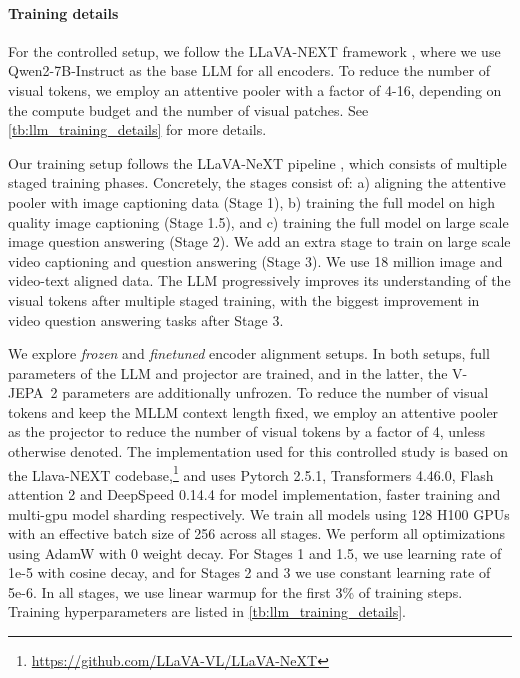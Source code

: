 \documentclass[]{fairmeta}
\newcommand{\model}{V-JEPA~2\xspace}
\begin{document}
\paragraph{\bf Training details} 
For the controlled setup, we follow the LLaVA-NEXT framework \citep{liu2024improved, zhang2024llavanext-video}, where we use Qwen2-7B-Instruct \citep{yang2024qwen2technicalreport} as the base LLM  for all encoders.
To reduce the number of visual tokens, we employ an attentive pooler with a factor of 4-16, depending on the compute budget and the number of visual patches. See \autoref{tb:llm_training_details} for more details.

Our training setup follows the LLaVA-NeXT pipeline \citep{li2024llava}, which consists of multiple staged training phases. Concretely, the stages consist of: a) aligning the attentive pooler with image captioning data (Stage 1), b) training the full model on high quality image captioning (Stage 1.5), and c) training the full model on large scale image question answering (Stage 2). We add an extra stage to train on large scale video captioning and question answering (Stage 3). 
We use 18 million image and video-text aligned data. 
The LLM progressively improves its understanding of the visual tokens after multiple staged training, with the biggest improvement in video question answering tasks after Stage 3. 

We explore \emph{frozen} and \emph{finetuned} encoder alignment setups.
In both setups, full parameters of the LLM and projector are trained, and in the latter, the \model parameters are additionally unfrozen. 
To reduce the number of visual tokens and keep the MLLM context length fixed, we employ an attentive pooler as the projector to reduce the number of visual tokens by a factor of 4, unless otherwise denoted.
The implementation used for this controlled study is based on the Llava-NEXT codebase,\footnote{\href{https://github.com/LLaVA-VL/LLaVA-NeXT}{https://github.com/LLaVA-VL/LLaVA-NeXT}} and uses Pytorch 2.5.1, Transformers 4.46.0, Flash attention 2 and DeepSpeed 0.14.4 for model implementation, faster training and multi-gpu model sharding respectively. We train all models using 128 H100 GPUs with an effective batch size of 256 across all stages. We perform all optimizations using AdamW with 0 weight decay. For Stages 1 and 1.5, we use learning rate of 1e-5 with cosine decay, and for Stages 2 and 3 we use constant learning rate of 5e-6. In all stages, we use linear warmup for the first 3\% of training steps.
Training hyperparameters are listed in \autoref{tb:llm_training_details}.
\end{document}
